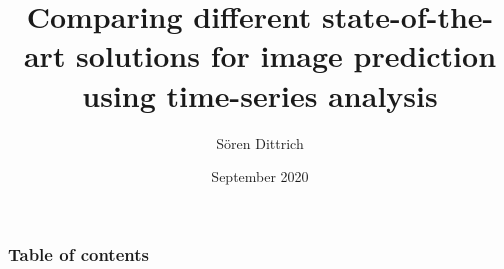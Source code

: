 \documentclass[12pt, a4paper]{beamer}
\title[Bachelorthesis Colloqium]{Comparing different state-of-the-art solutions for image prediction using time-series analysis}
\author{Sören Dittrich} %
\institute[] %
{
Uni Hildesheim \\ %
}
\date{September 2020} %
\begin{document}
 \begin{frame}
 \titlepage %
 \end{frame}
 \begin{frame}
 \frametitle{Table of contents} %
 \tableofcontents %
 \end{frame}


 
 
 

 
 
 
 
% 
 
 
 
 
 
 
\end{document}
